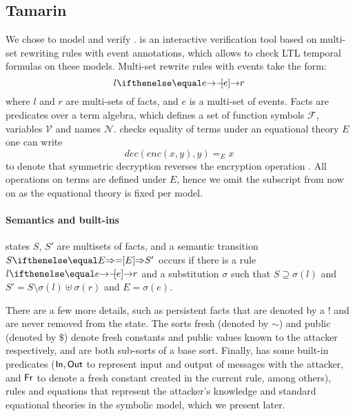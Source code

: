 

\subsection{Tamarin}
We chose \mTamarin{} to model and verify \mEdhoc{} .
%
\mTamarin{} is an interactive verification tool based on multi-set rewriting rules
with event annotations, which allows  to check LTL temporal formulas on these
models.
%
Multi-set rewrite rules with events take the form:
%
\[ l \ifarrow[e] r \]
%
where $l$ and $r$ are multi-sets of facts, and $e$ is a multi-set of events.
%
Facts are  predicates over a term algebra, which defines a set of function
symbols $\mathcal F$, variables $\mathcal V$ and names $\mathcal N$. \mTamarin{}
checks equality of  terms under an equational theory $E$ one can
write 
%
\[ dec(enc(x,y),y) =_E x \]
%
to denote that symmetric decryption reverses the encryption operation . All operations on terms are defined under $E$, hence we omit the
subscript from now on as the equational theory is fixed per model.

\paragraph{Semantics and built-ins} \phantom{}  \mTamarin{} states
$S$, $S'$ are multisets of facts, and a semantic transition $S \semarrow[E] S'$
occurs if there is a rule $l \ifarrow[e] r$ and a substitution $\sigma$ such
that $S \supseteq \sigma(l)$ and $S' = S \setminus \sigma(l) \uplus \sigma(r)$
and $E = \sigma(e)$.

There are a few more details, such as persistent facts that are denoted by a $!$
and are never removed from the state.
%
The sorts fresh (denoted by $\sim$) and public (denoted by $\$$) denote fresh
constants and public values known to the attacker respectively, and are both
sub-sorts of a base sort. 
%
Finally, \mTamarin{} has some built-in predicates ($\mathsf{In},
\mathsf{Out}$ to represent input and output of messages with the attacker,
and
$\mathsf{Fr}$ to denote a fresh constant created in the current rule, among
others), rules and equations that represent the attacker's knowledge
and standard equational theories in the symbolic model,  which we present later.

